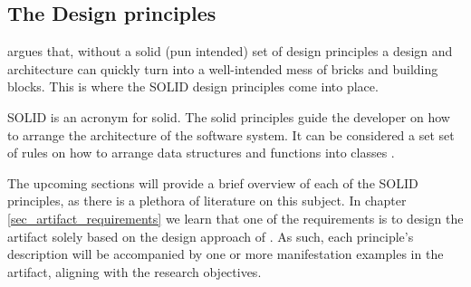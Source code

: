 \subsection{The Design principles} \label{subsec_design_principles}

 argues that, without a solid (pun intended) set of
design principles a design and architecture can quickly turn into a well-intended mess
of bricks and building blocks. This is where the SOLID design principles come into place.

SOLID is an acronym for \gls{solid}. The \gls{solid} principles guide the developer on how
to arrange the architecture of the software system. It can be considered a set set of
rules on how to arrange data structures and functions into classes
\parencite[78]{robert_c_martin_clean_2018}.

The upcoming sections will provide a brief overview of each of the SOLID principles, as
there is a plethora of literature on this subject. In chapter
\ref{sec_artifact_requirements} we learn that one of the requirements is to design the
artifact solely based on the design approach of \ca. As such, each principle's description
will be accompanied by one or more manifestation examples in the artifact, aligning with
the research objectives.